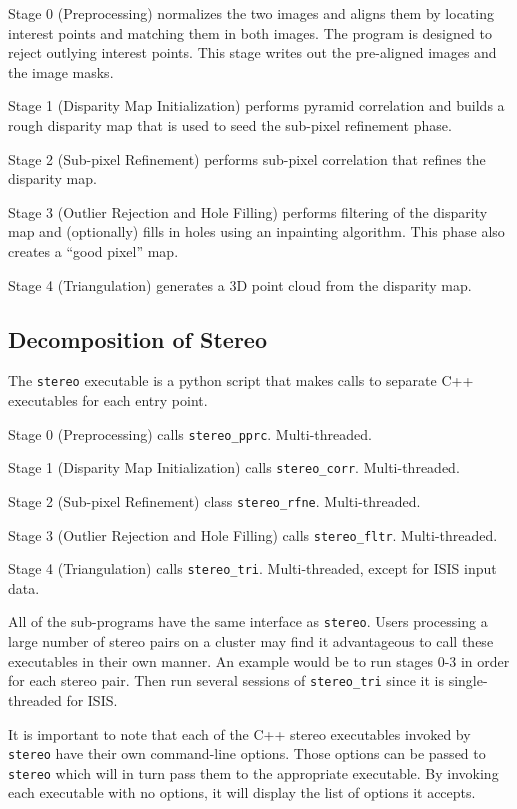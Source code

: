 Stage 0 (Preprocessing) normalizes the two images and aligns them
by locating interest points and matching them in both images. The
program is designed to reject outlying interest points.  This stage
writes out the pre-aligned images and the image masks.

Stage 1 (Disparity Map Initialization) performs pyramid correlation and builds a rough disparity map that is used to seed the sub-pixel refinement phase.

Stage 2 (Sub-pixel Refinement) performs sub-pixel correlation that
refines the disparity map.

Stage 3 (Outlier Rejection and Hole Filling) performs filtering of the
disparity map and (optionally) fills in holes using an inpainting
algorithm.  This phase also creates a ``good pixel'' map.

Stage 4 (Triangulation) generates a 3D point cloud from the disparity
map.

\subsection{Decomposition of Stereo}
\label{stereo_dec}

The \texttt{stereo}
executable is a python script that makes calls to separate
C++ executables for each entry point.

Stage 0 (Preprocessing) calls \texttt{stereo\_pprc}. Multi-threaded.

Stage 1 (Disparity Map Initialization) calls
\texttt{stereo\_corr}. Multi-threaded.

Stage 2 (Sub-pixel Refinement) class \texttt{stereo\_rfne}. Multi-threaded.

Stage 3 (Outlier Rejection and Hole Filling) calls
\texttt{stereo\_fltr}. Multi-threaded.

Stage 4 (Triangulation) calls \texttt{stereo\_tri}. Multi-threaded,
except for ISIS input data.

All of the sub-programs have the same interface as
\texttt{stereo}. Users processing a large number of stereo pairs on a
cluster may find it advantageous to call these executables in their own
manner. An example would be to run stages 0-3 in order for each stereo
pair. Then run several sessions of \texttt{stereo\_tri} since it is
single-threaded for ISIS.

It is important to note that each of the C++ stereo executables invoked
by \texttt{stereo} have their own command-line options. Those options
can be passed to \texttt{stereo} which will in turn pass them to the
appropriate executable. By invoking each executable with no options, it
will display the list of options it accepts.

